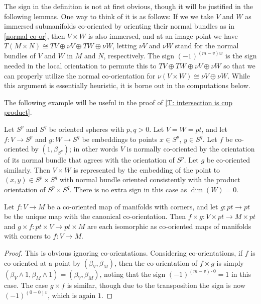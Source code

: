 \begin{remark}
	The sign in the definition is not at first obvious, though it will be justified in the following lemmas.
	One way to think of it is as follows: If we we take $V$ and $W$ as immersed submanifolds co-oriented by orienting their normal bundles as in \cref{normal co-or}, then $V \times W$ is also immersed, and at an image point we have $T(M \times N) \cong TV \oplus \nu V \oplus TW \oplus \nu W$, letting $\nu V$ and $\nu W$ stand for the normal bundles of $V$ and $W$ in $M$ and $N$, respectively.
	The sign $(-1)^{(m-v)w}$ is the sign needed in the local orientation to permute this to $TV \oplus TW \oplus \nu V \oplus \nu W$ so that we can properly utilize the normal co-orientation for $\nu(V \times W) \cong \nu V \oplus \nu W$.
	While this argument is essentially heuristic, it is borne out in the computations below.
\end{remark}

The following example will be useful in the proof of \cref{T: intersection is cup product}.

\begin{example}\label{E: sphere product}
	Let $S^p$ and $S^q$ be oriented spheres with $p,q>0$.
	Let $V = W = pt$, and let $f \colon V \to S^p$ and $g \colon W \to S^q$ be embeddings to points $x \in S^p$, $y \in S^q$.
	Let $f$ be co-oriented by $(1,\beta_{S^p})$; in other words $V$ is normally co-oriented by the orientation of its normal bundle that agrees with the orientation of $S^p$.
	Let $g$ be co-oriented similarly.
	Then $V \times W$ is represented by the embedding of the point to $(x,y) \in S^p \times S^q$ with normal bundle oriented consistently with the product orientation of $S^p \times S^q$.
	There is no extra sign in this case as $\dim(W) = 0$.
\end{example}

\begin{proposition}\label{P: co-oriented exterior unit}
	Let $f \colon V \to M$ be a co-oriented map of manifolds with corners, and let $g:pt \to pt$ be the unique map with the canonical co-orientation.
	Then $f \times g \colon V \times pt \to M \times pt$ and $g \times f:pt \times V \to pt \times M$ are each isomorphic as co-oriented maps of manifolds with corners to $f \colon V \to M$.
\end{proposition}

\begin{proof}
	This is obvious ignoring co-orientations.
	Considering co-orientations, if $f$ is co-oriented at a point by $(\beta_V,\beta_M)$, then the co-orientation of $f \times g$ is simply $(\beta_V \wedge 1,\beta_M \wedge 1) = (\beta_V,\beta_M)$, noting that
	the sign $(-1)^{(m-v)\cdot 0} = 1$ in this case.
	The case $g \times f$ is similar, though due to the transposition the sign is now $(-1)^{(0-0)v}$, which is again $1$.
\end{proof}

